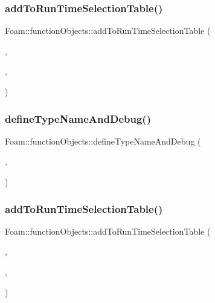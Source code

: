 \subsubsection{\texorpdfstring{add\+To\+Run\+Time\+Selection\+Table()}{addToRunTimeSelectionTable()}\hspace{0.1cm}{\footnotesize\ttfamily [2/8]}}
{\footnotesize\ttfamily Foam\+::function\+Objects\+::add\+To\+Run\+Time\+Selection\+Table (\begin{DoxyParamCaption}\item[{function\+Object}]{,  }\item[{\hyperlink{classFoam_1_1functionObjects_1_1massFlow}{mass\+Flow}}]{,  }\item[{dictionary}]{ }\end{DoxyParamCaption})}

\mbox{\label{namespaceFoam_1_1functionObjects_a7546d07aca46a68ca34482fa6f47ffcc}} 
\subsubsection{\texorpdfstring{define\+Type\+Name\+And\+Debug()}{defineTypeNameAndDebug()}\hspace{0.1cm}{\footnotesize\ttfamily [3/8]}}
{\footnotesize\ttfamily Foam\+::function\+Objects\+::define\+Type\+Name\+And\+Debug (\begin{DoxyParamCaption}\item[{\hyperlink{classFoam_1_1functionObjects_1_1patchScalarFieldValue}{patch\+Scalar\+Field\+Value}}]{,  }\item[{0}]{ }\end{DoxyParamCaption})}

\mbox{\label{namespaceFoam_1_1functionObjects_a28017dcbb9893f088b30015d7b33e0ba}} 
\subsubsection{\texorpdfstring{add\+To\+Run\+Time\+Selection\+Table()}{addToRunTimeSelectionTable()}\hspace{0.1cm}{\footnotesize\ttfamily [3/8]}}
{\footnotesize\ttfamily Foam\+::function\+Objects\+::add\+To\+Run\+Time\+Selection\+Table (\begin{DoxyParamCaption}\item[{function\+Object}]{,  }\item[{\hyperlink{classFoam_1_1functionObjects_1_1patchScalarFieldValue}{patch\+Scalar\+Field\+Value}}]{,  }\item[{dictionary}]{ }\end{DoxyParamCaption})}

